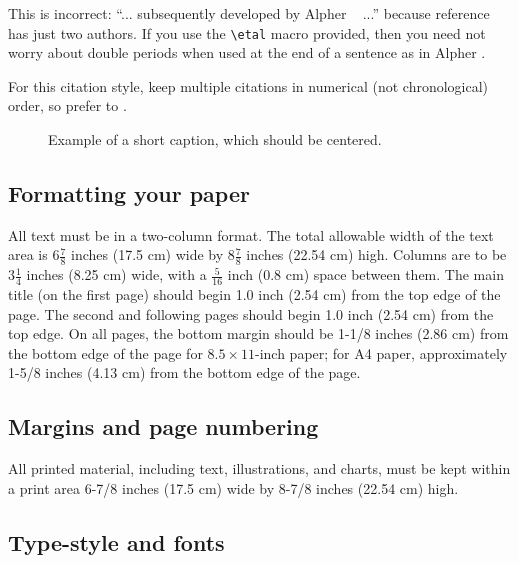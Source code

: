 \documentclass[10pt,twocolumn,letterpaper]{article}
\begin{document}
This is incorrect: ``... subsequently developed by Alpher \etal~\cite{Alpher03} ...''
because reference~\cite{Alpher03} has just two authors.  If you use the
\verb'\etal' macro provided, then you need not worry about double periods
when used at the end of a sentence as in Alpher \etal.

For this citation style, keep multiple citations in numerical (not
chronological) order, so prefer \cite{Alpher03,Alpher02,Authors14} to
\cite{Alpher02,Alpher03,Authors14}.


\begin{figure}
   \begin{center}
      \fbox{\rule{0pt}{2in} \rule{.9\linewidth}{0pt}}
   \end{center}
   \caption{Example of a short caption, which should be centered.}
   \label{fig:short}
\end{figure}

\subsection{Formatting your paper}

All text must be in a two-column format. The total allowable width of the
text area is $6\frac78$ inches (17.5 cm) wide by $8\frac78$ inches (22.54
cm) high. Columns are to be $3\frac14$ inches (8.25 cm) wide, with a
$\frac{5}{16}$ inch (0.8 cm) space between them. The main title (on the
first page) should begin 1.0 inch (2.54 cm) from the top edge of the
page. The second and following pages should begin 1.0 inch (2.54 cm) from
the top edge. On all pages, the bottom margin should be 1-1/8 inches (2.86
cm) from the bottom edge of the page for $8.5 \times 11$-inch paper; for A4
paper, approximately 1-5/8 inches (4.13 cm) from the bottom edge of the
page.

\subsection{Margins and page numbering}

All printed material, including text, illustrations, and charts, must be kept
within a print area 6-7/8 inches (17.5 cm) wide by 8-7/8 inches (22.54 cm)
high.



\subsection{Type-style and fonts}
\end{document}
